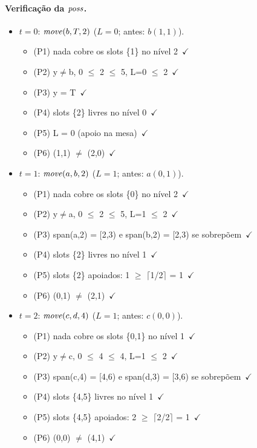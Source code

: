 \paragraph{Verificação da $\mathit{poss}$.}\begin{itemize}
\item $t=0$: $\mathit{move}(b,T,2)$ ($L=0$; antes: $b(1,1)$).
\begin{itemize}
\item (P1) nada cobre os slots \{1\} no nível 2\ $\checkmark$
\item (P2) y$\neq$b, 0 $\le$ 2 $\le$ 5, L=0 $\le$ 2\ $\checkmark$
\item (P3) y = T\ $\checkmark$
\item (P4) slots \{2\} livres no nível 0\ $\checkmark$
\item (P5) L = 0 (apoio na mesa)\ $\checkmark$
\item (P6) (1,1) $\neq$ (2,0)\ $\checkmark$
\end{itemize}
\item $t=1$: $\mathit{move}(a,b,2)$ ($L=1$; antes: $a(0,1)$).
\begin{itemize}
\item (P1) nada cobre os slots \{0\} no nível 2\ $\checkmark$
\item (P2) y$\neq$a, 0 $\le$ 2 $\le$ 5, L=1 $\le$ 2\ $\checkmark$
\item (P3) span(a,2) = [2,3) e span(b,2) = [2,3) se sobrepõem\ $\checkmark$
\item (P4) slots \{2\} livres no nível 1\ $\checkmark$
\item (P5) slots \{2\} apoiados: 1 $\ge$ $\lceil$1/2$\rceil$ = 1\ $\checkmark$
\item (P6) (0,1) $\neq$ (2,1)\ $\checkmark$
\end{itemize}
\item $t=2$: $\mathit{move}(c,d,4)$ ($L=1$; antes: $c(0,0)$).
\begin{itemize}
\item (P1) nada cobre os slots \{0,1\} no nível 1\ $\checkmark$
\item (P2) y$\neq$c, 0 $\le$ 4 $\le$ 4, L=1 $\le$ 2\ $\checkmark$
\item (P3) span(c,4) = [4,6) e span(d,3) = [3,6) se sobrepõem\ $\checkmark$
\item (P4) slots \{4,5\} livres no nível 1\ $\checkmark$
\item (P5) slots \{4,5\} apoiados: 2 $\ge$ $\lceil$2/2$\rceil$ = 1\ $\checkmark$
\item (P6) (0,0) $\neq$ (4,1)\ $\checkmark$

\end{itemize}
\end{itemize}
